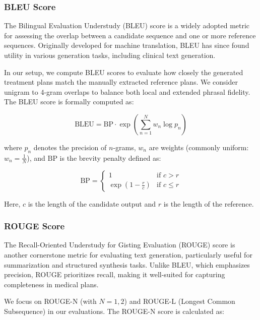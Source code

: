 \documentclass[pdflatex,sn-mathphys-num]{sn-jnl}%
\theoremstyle{thmstyleone}%
\theoremstyle{thmstyletwo}%
\theoremstyle{thmstylethree}%
\begin{document}
\subsubsection{BLEU Score}\label{subsec3.6.1}

The Bilingual Evaluation Understudy (BLEU) score is a widely adopted metric for assessing the overlap between a candidate sequence and one or more reference sequences. Originally developed for machine translation, BLEU has since found utility in various generation tasks, including clinical text generation.

In our setup, we compute BLEU scores to evaluate how closely the generated treatment plans match the manually extracted reference plans. We consider unigram to 4-gram overlaps to balance both local and extended phrasal fidelity. The BLEU score is formally computed as:

\begin{equation}
\text{BLEU} = \text{BP} \cdot \exp\left( \sum_{n=1}^{N} w_n \log p_n \right)
\end{equation}

where \( p_n \) denotes the precision of \( n \)-grams, \( w_n \) are weights (commonly uniform: \( w_n = \frac{1}{N} \)), and \( \text{BP} \) is the brevity penalty defined as:

\begin{equation}
\text{BP} =
\begin{cases}
1 & \text{if } c > r \\
\exp(1 - \frac{r}{c}) & \text{if } c \leq r
\end{cases}
\end{equation}

Here, \( c \) is the length of the candidate output and \( r \) is the length of the reference.

\subsubsection{ROUGE Score}\label{subsec3.6.2}

The Recall-Oriented Understudy for Gisting Evaluation (ROUGE) score is another cornerstone metric for evaluating text generation, particularly useful for summarization and structured synthesis tasks. Unlike BLEU, which emphasizes precision, ROUGE prioritizes recall, making it well-suited for capturing completeness in medical plans.

We focus on ROUGE-N (with \( N=1,2 \)) and ROUGE-L (Longest Common Subsequence) in our evaluations. The ROUGE-N score is calculated as:
\end{document}
